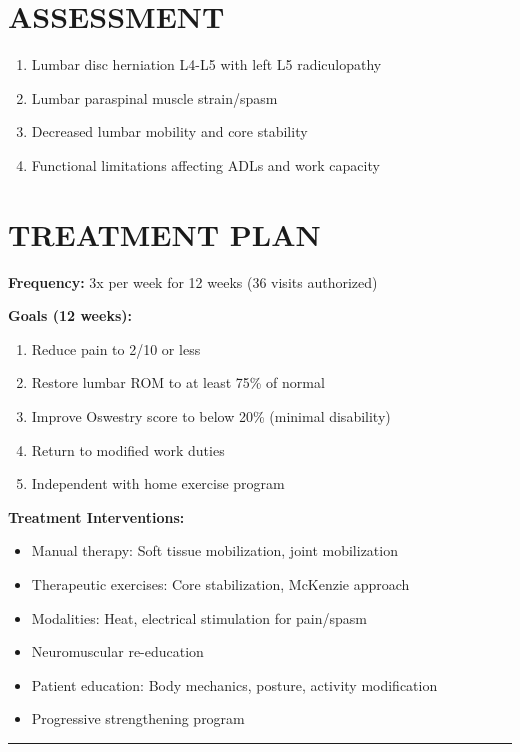 \documentclass[11pt]{article}
\begin{document}
\section*{ASSESSMENT}

\begin{enumerate}
\item Lumbar disc herniation L4-L5 with left L5 radiculopathy
\item Lumbar paraspinal muscle strain/spasm
\item Decreased lumbar mobility and core stability
\item Functional limitations affecting ADLs and work capacity
\end{enumerate}

\section*{TREATMENT PLAN}

\textbf{Frequency:} 3x per week for 12 weeks (36 visits authorized)

\textbf{Goals (12 weeks):}
\begin{enumerate}
\item Reduce pain to 2/10 or less
\item Restore lumbar ROM to at least 75\% of normal
\item Improve Oswestry score to below 20\% (minimal disability)
\item Return to modified work duties
\item Independent with home exercise program
\end{enumerate}

\textbf{Treatment Interventions:}
\begin{itemize}[nosep]
\item Manual therapy: Soft tissue mobilization, joint mobilization
\item Therapeutic exercises: Core stabilization, McKenzie approach
\item Modalities: Heat, electrical stimulation for pain/spasm
\item Neuromuscular re-education
\item Patient education: Body mechanics, posture, activity modification
\item Progressive strengthening program
\end{itemize}

\vspace{1em}
\hrule
\vspace{1em}
\end{document}
